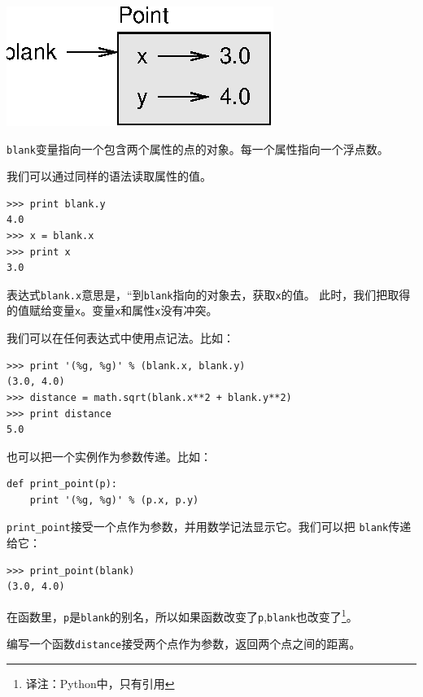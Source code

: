  \beforefig
\centerline{\includegraphics{figs/point.eps}}
\afterfig

{\tt blank}变量指向一个包含两个属性的点的对象。每一个属性指向一个浮点数。

我们可以通过同样的语法读取属性的值。

\beforeverb
\begin{verbatim}
>>> print blank.y
4.0
>>> x = blank.x
>>> print x
3.0
\end{verbatim}
\afterverb


表达式{\tt blank.x}意思是，“到{\tt blank}指向的对象去，获取{\tt x}的值。
此时，我们把取得的值赋给变量{\tt x}。变量{\tt x}和属性{\tt x}没有冲突。

我们可以在任何表达式中使用点记法。比如：

\beforeverb
\begin{verbatim}
>>> print '(%g, %g)' % (blank.x, blank.y)
(3.0, 4.0)
>>> distance = math.sqrt(blank.x**2 + blank.y**2)
>>> print distance
5.0
\end{verbatim}
\afterverb
%

也可以把一个实例作为参数传递。比如：

\beforeverb
\begin{verbatim}
def print_point(p):
    print '(%g, %g)' % (p.x, p.y)
\end{verbatim}
\afterverb

\verb"print_point"接受一个点作为参数，并用数学记法显示它。我们可以把
{\tt blank}传递给它：

\beforeverb
\begin{verbatim}
>>> print_point(blank)
(3.0, 4.0)
\end{verbatim}
\afterverb
%

在函数里，{\tt p}是{\tt blank}的别名，所以如果函数改变了{\tt p},{\tt blank}也改变了\footnote{译注：Python中，只有引用}。


\begin{ex}
编写一个函数{\tt distance}接受两个点作为参数，返回两个点之间的距离。
\end{ex}



